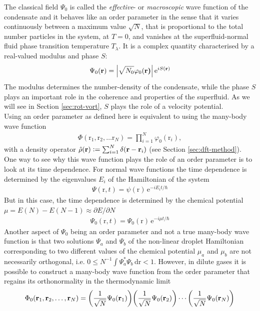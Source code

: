 \documentclass[12pt,a4paper,twosides]{book}
\renewcommand{\vec}[1]{\bm{\mathrm{#1}}}
\newcommand{\unit}[1]{\,\mathrm{#1}}
\begin{document}
			The classical field $\Psi_0$ is called the \emph{effective}- or \emph{macroscopic} wave function of the condensate and it behaves like an order parameter in the sense that it varies continuously between a maximum value $\sqrt{N}$, that is proportional to the total number particles in the system, at $T=0$, and vanishes at the superfluid-normal fluid phase transition temperature $T_\lambda$. It is a complex quantity characterised by a real-valued modulus and phase $S$:
			\begin{align}
				\Psi_0(\vec{r}) = \absolutevalue{\sqrt{N_0}\varphi_0(\vec{r)}}\,\mathrm{e}^{iS(\vec{r})}\label{eq:order-param-complex}
			\end{align}
			The modulus determines the number-density of the condensate, while the phase $S$ plays an important role in the coherence and properties of the superfluid. As we will see in Section \ref{sec:rot-vort}, $S$ plays the role of a velocity potential.\\
			
			Using an order parameter as defined here is equivalent to using the many-body wave function
			\begin{align}
				\Phi(\vec{r}_1,\vec{r}_2,\ldots\vec{r}_N)=\prod_{i=1}^{N}\varphi_0(\vec{r}_i),
			\end{align}
			with a density operator $\hat{\rho}(\vec{r}) \vcentcolon= \sum_{i=1}^{N}\delta(\vec{r}-\vec{r}_i)$ (see Section \ref{sec:dft-method}). One way to see why this wave function plays the role of an order parameter is to look at its time dependence. For normal wave functions the time dependence is determined by the eigenvalues $E_i$ of the Hamiltonian of the system
			\begin{align}
				\Psi(\vec{r},t)=\psi(\vec{r})\,\mathrm{e}^{-iE_it/\hbar}
			\end{align}
			But in this case, the time dependence is determined by the chemical potential $\mu=E(N)-E(N-1)\approx \partial E/\partial N$
			\begin{align}
				\Psi_0(\vec{r},t)=\Psi_0(\vec{r})\,\mathrm{e}^{-i\mu t/\hbar} \label{eq:td-order-param}
			\end{align}
			Another aspect of $\Psi_0$ being an order parameter and not a true many-body wave function is that two solutions $\Psi_a$ and $\Psi_b$ of the non-linear droplet Hamiltonian corresponding to two different values of the chemical potential $\mu_a$ and $\mu_b$ are not necessarily orthogonal, i.e. $0 \leq N^{-1}\int\!\Psi_a^*\Psi_b\unit{d}\vec{r} < 1$. However, in dilute gases it is possible to construct a many-body wave function from the order parameter that regains its orthonormality in the thermodynamic limit
			\begin{align}
				\Phi_0(\vec{r}_1,\vec{r}_2,\ldots,\vec{r}_N) = \qty(\frac{1}{\sqrt{N}}\Psi_0(\vec{r}_1))\qty(\frac{1}{\sqrt{N}}\Psi_0(\vec{r}_2))\cdots\qty(\frac{1}{\sqrt{N}}\Psi_0(\vec{r}_N))
			\end{align}
			
\end{document}
